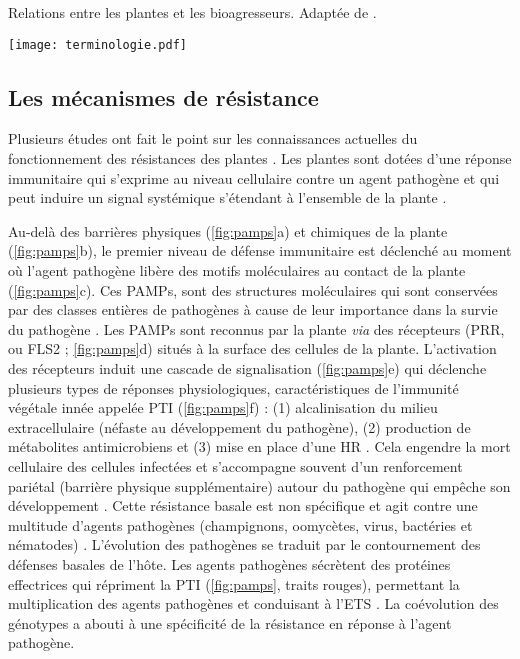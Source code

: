 \begin{table}[ht]
  \centering
	\caption[Relations entre les plantes et les bioagresseurs]{Relations entre les plantes et les bioagresseurs. Adaptée de \citet{Cooper1983, Hammond-Kosack2007,Villeneuve2013}.}
	\label{tab:termi}
	\texttt{[image: terminologie.pdf]}
\end{table}

\subsection{Les mécanismes de résistance}
	
	Plusieurs études ont fait le point sur les connaissances actuelles du fonctionnement des résistances des plantes \citep{Bent2007, Nimchuk2003, Jones2006}. Les plantes sont dotées d'une réponse immunitaire qui s'exprime au niveau cellulaire contre un agent pathogène et qui peut induire un signal systémique s'étendant à l'ensemble de la plante \citep{Jones2006}. 

	Au-delà des barrières physiques  (\autoref{fig:pamps}a) et chimiques de la plante  (\autoref{fig:pamps}b), le premier niveau de défense immunitaire est déclenché au moment  où l'agent pathogène  libère des motifs moléculaires  au contact de la plante  (\autoref{fig:pamps}c). Ces \glspl{PAMP}, sont des structures moléculaires qui sont conservées par des classes entières de pathogènes à cause de leur importance dans la survie du pathogène \citep{Gohre2008}. 
Les \glspl{PAMP} sont reconnus par la plante \textit{via} des récepteurs (\gls{PRR}, ou FLS2 ; \autoref{fig:pamps}d) situés à  la surface des cellules de la plante. 
L'activation des récepteurs induit une cascade de signalisation  (\autoref{fig:pamps}e) qui déclenche  plusieurs types de réponses physiologiques, caractéristiques de l’immunité végétale innée appelée  \gls{PTI} (\autoref{fig:pamps}f)  :
(1) alcalinisation du milieu extracellulaire (néfaste au développement du pathogène), (2) production de  métabolites antimicrobiens et  (3)  mise en place d'une \gls{HR} \citep{Jones2006}. 
Cela  engendre la mort cellulaire des cellules infectées  et s’accompagne souvent d’un renforcement pariétal (barrière
physique supplémentaire)  autour du pathogène qui empêche son développement \citep{Faulkner2012}.
Cette résistance basale est non spécifique et agit contre une multitude d'agents pathogènes (champignons, oomycètes, virus, bactéries et  nématodes) \citep{Boller2009}. L'évolution des pathogènes se traduit par le contournement des défenses basales de l’hôte. Les agents pathogènes sécrètent  des protéines effectrices  qui répriment  la \gls{PTI} (\autoref{fig:pamps}, traits rouges), permettant la multiplication des agents pathogènes et conduisant à l’\gls{ETS} \citep{Jones2006, Dodds2010}. La coévolution des génotypes a abouti à une spécificité de la résistance en réponse à l'agent pathogène.

